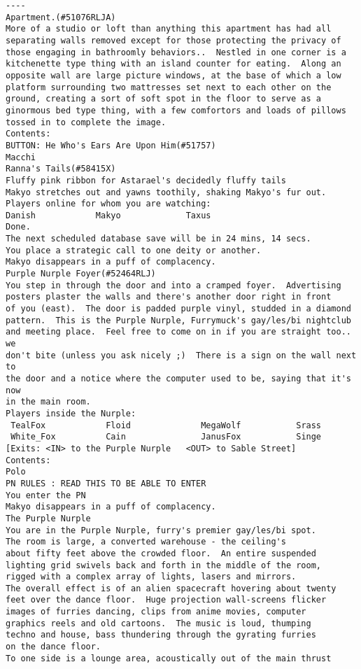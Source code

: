 \begin{verbatim}
----
Apartment.(#51076RLJA)
More of a studio or loft than anything this apartment has had all separating walls removed except for those protecting the privacy of those engaging in bathroomly behaviors..  Nestled in one corner is a kitchenette type thing with an island counter for eating.  Along an opposite wall are large picture windows, at the base of which a low platform surrounding two mattresses set next to each other on the ground, creating a sort of soft spot in the floor to serve as a ginormous bed type thing, with a few comfortors and loads of pillows tossed in to complete the image.
Contents:
BUTTON: He Who's Ears Are Upon Him(#51757)
Macchi
Ranna's Tails(#58415X)
Fluffy pink ribbon for Astarael's decidedly fluffy tails
Makyo stretches out and yawns toothily, shaking Makyo's fur out.
Players online for whom you are watching:
Danish            Makyo             Taxus
Done.
The next scheduled database save will be in 24 mins, 14 secs.
You place a strategic call to one deity or another.
Makyo disappears in a puff of complacency.
Purple Nurple Foyer(#52464RLJ)
You step in through the door and into a cramped foyer.  Advertising
posters plaster the walls and there's another door right in front
of you (east).  The door is padded purple vinyl, studded in a diamond
pattern.  This is the Purple Nurple, Furrymuck's gay/les/bi nightclub
and meeting place.  Feel free to come on in if you are straight too.. we
don't bite (unless you ask nicely ;)  There is a sign on the wall next to
the door and a notice where the computer used to be, saying that it's now
in the main room.
Players inside the Nurple:
 TealFox            Floid              MegaWolf           Srass
 White_Fox          Cain               JanusFox           Singe
[Exits: <IN> to the Purple Nurple   <OUT> to Sable Street]
Contents:
Polo
PN RULES : READ THIS TO BE ABLE TO ENTER
You enter the PN
Makyo disappears in a puff of complacency.
The Purple Nurple
You are in the Purple Nurple, furry's premier gay/les/bi spot.
The room is large, a converted warehouse - the ceiling's
about fifty feet above the crowded floor.  An entire suspended
lighting grid swivels back and forth in the middle of the room,
rigged with a complex array of lights, lasers and mirrors.
The overall effect is of an alien spacecraft hovering about twenty
feet over the dance floor.  Huge projection wall-screens flicker
images of furries dancing, clips from anime movies, computer
graphics reels and old cartoons.  The music is loud, thumping
techno and house, bass thundering through the gyrating furries
on the dance floor.
To one side is a lounge area, acoustically out of the main thrust

\end{verbatim}
